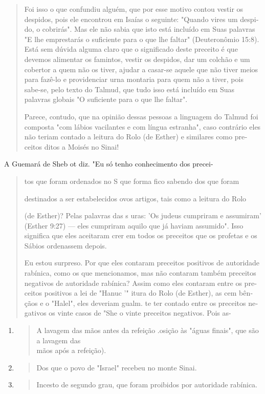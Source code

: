 \begin{quote}
Foi isso o que confundiu alguém, que por esse motivo contou vestir os
despidos, pois ele encontrou em Isaías o seguinte: "Quando vires um
despi­do, o cobrirás". Mas ele não sabia que isto está incluído em Suas
palavras "E lhe emprestarás o suficiente para o que lhe faltar"
(Deuteronômio 15:8). Está sem dúvida alguma claro que o significado
deste preceito é que devemos ali­mentar os famintos, vestir os despidos,
dar um colchão e um cobertor a quem não os tiver, ajudar a casar-se
aquele que não tiver meios para fazê-lo e provi­denciar urna montaria
para quem não a tiver, pois sabe-se, pelo texto do Tal­mud, que tudo
isso está incluído em Suas palavras globais "O suficiente para o que lhe
faltar".

Parece, contudo, que na opinião dessas pessoas a linguagem do Tal­mud
foi composta "com lábios vacilantes e com língua estranha", caso
contrá­rio eles não teriam contado a leitura do Rolo (de Esther) e
similares como pre­ceitos ditos a Moisés no Sinai!
\end{quote}

A Guemará de Sheb ot diz. "Eu só tenho conhecimento dos precei-

\begin{quote}
tos que foram ordenados no S que forma fico sabendo dos que foram

destinados a ser estabelecidos ovos artigos, tais como a leitura do Rolo

(de Esther)? Pelas palavras das s uras: 'Os judeus cumpriram e
assumiram' (Esther 9:27) --- eles cumpriram aquilo que já haviam
assumido". Isso significa que eles aceitaram crer em todos os preceitos
que os profetas e os Sábios orde­nassem depois.

Eu estou surpreso. Por que eles contaram preceitos positivos de
au­toridade rabínica, como os que mencionamos, mas não contaram também
pre­ceitos negativos de autoridade rabínica? Assim como eles contaram
entre os pre­ceitos positivos a lei de "Hanuc '" itura do Rolo (de
Esther), as cem bên­çãos e o "Halel", eles deveriam gualm. te ter
contado entre os preceitos ne­gativos os vinte casos de "She o vinte
preceitos negativos. Pois as-
\end{quote}

\begin{enumerate}
\def\labelenumi{\arabic{enumi}.}
\setcounter{enumi}{2}
\item
  \begin{quote}
  A lavagem das mãos antes da refeição .osição às "águas finais", que
  são a lavagem das\\
  mãos após a refeição).
  \end{quote}
\item
  \begin{quote}
  Dos que o povo de "Israel" recebeu no monte Sinai.
  \end{quote}
\item
  \begin{quote}
  Incesto de segundo grau, que foram proibidos por autoridade rabínica.
  \end{quote}
\end{enumerate}

